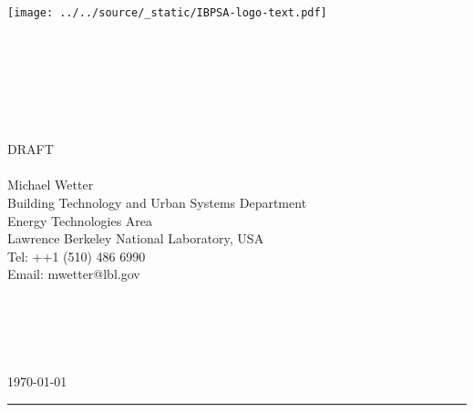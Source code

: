 \begin{titlepage}
\hspace*{12.1cm}\texttt{[image: ../../source/\_static/IBPSA-logo-text.pdf]}~\\
\begin{flushright}
\vspace{-1cm}
\large{~}
\\[5mm]
\hrulefill
\\[5mm]
 \Large{}\\
 \Large{}\\
\Large{}\\[3mm]
\hrulefill
~\\[20mm]
DRAFT~\\
~\\[20mm]
\large{Michael Wetter\\
Building Technology and Urban Systems Department\\
Energy Technologies Area\\
Lawrence Berkeley National Laboratory, USA\\
Tel: ++1 (510) 486 6990\\
Email: mwetter@lbl.gov\\
~\\
~\\
~\\
~\\
~}\\[20mm]
\large{\today}
\\[20mm]
\end{flushright}
\hrule
~\\[2mm]
\end{titlepage}
